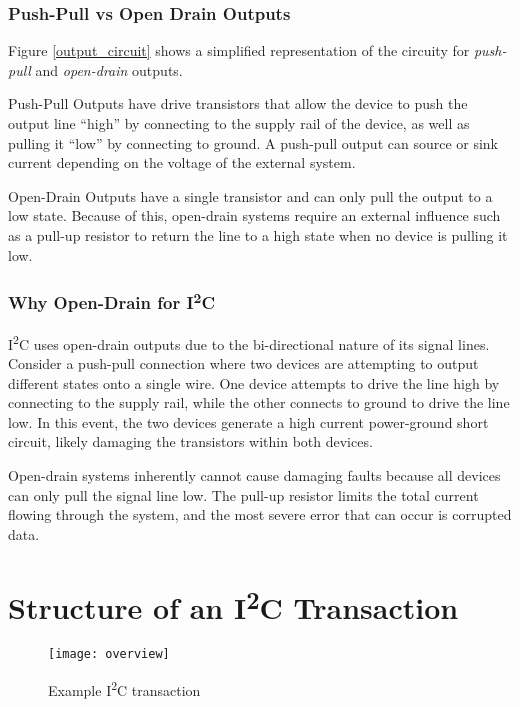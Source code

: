 \documentclass[11pt,fleqn]{book} %
\begin{document}
        \subsubsection{Push-Pull vs Open Drain Outputs}
        Figure \ref{output_circuit} shows a simplified representation of the circuity for \textit{push-pull} and \textit{open-drain} outputs. 
        
        Push-Pull Outputs have drive transistors that allow the device to push the output line ``high'' by connecting to the supply rail of the device, as well as pulling it ``low'' by connecting to ground. A push-pull output can source or sink current depending on the voltage of the external system. 
        
        Open-Drain Outputs have a single transistor and can only pull the output to a low state. Because of this, open-drain systems require an external influence such as a pull-up resistor to return the line to a high state when no device is pulling it low. 
        
        \subsubsection{Why Open-Drain for I\textsuperscript{2}C}
            I\textsuperscript{2}C uses open-drain outputs due to the bi-directional nature of its signal lines. Consider a push-pull connection where two devices are attempting to output different states onto a single wire. One device attempts to drive the line high by connecting to the supply rail, while the other connects to ground to drive the line low. In this event, the two devices generate a high current power-ground short circuit, likely damaging the transistors within both devices. 
            
            Open-drain systems inherently cannot cause damaging faults because all devices can only pull the signal line low. The pull-up resistor limits the total current flowing through the system, and the most severe error that can occur is corrupted data. 

\section{Structure of an I\textsuperscript{2}C Transaction}	
    
    \begin{figure}[]
        \centering\texttt{[image: overview]}
        \caption{Example I\textsuperscript{2}C transaction}
        \label{overview}
    \end{figure}
    
\end{document}
